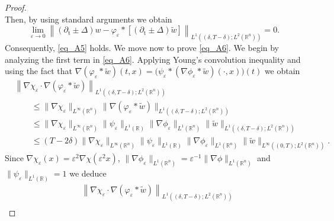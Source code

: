 \documentclass[10pt,a4paper]{amsart}
\theoremstyle{remark}
\theoremstyle{definition}
\begin{document}
\begin{proof}
$$$$
Then, by using standard arguments we obtain
$$
\lim _{\varepsilon \rightarrow 0}\left\|\left( \partial_{\mathrm{t}}\pm\Delta\right) w-\varphi_{\varepsilon} \ast\left[\left( \partial_{\mathrm{t}}\pm\Delta\right) \tilde{w}\right]\right\|_{L^1\left((\delta, T-\delta) ; L^2\left(\mathbb{R}^n\right)\right)}=0 .
$$
Consequently, \eqref{eq_A5} holds. We move now to prove \eqref{eq_A6}. We begin by analyzing the first term in \eqref{eq_A6}. Applying Young’s convolution inequality and using the fact that $ \nabla\left(\varphi_{\varepsilon} \ast \tilde{w}\right)(t,x)= \big(\psi_{\varepsilon} \ast \left( \nabla \phi_{\varepsilon} \ast \tilde{w}\right)(\cdot, x)\big) (t)$ we obtain 
\begin{align*}
& \left\|\nabla \chi_{\varepsilon} \cdot \nabla\left(\varphi_{\varepsilon} \ast \tilde{w}\right)\right\|_{L^1\left((\delta, T-\delta) ; L^2\left(\mathbb{R}^n\right)\right)} \\
 &\qquad \leq \|  \nabla \chi_{\varepsilon} \|_{L^\infty\left(\mathbb{R}^n\right)} \|  \nabla\left(\varphi_{\varepsilon} \ast \tilde{w}\right)\|_{L^1\left((\delta, T-\delta) ; L^2\left(\mathbb{R}^n\right)\right)}\\
 &\qquad\leq \|  \nabla \chi_{\varepsilon} \|_{L^\infty\left(\mathbb{R}^n\right)} \|  \psi_{\varepsilon} \|_{L^1\left(\mathbb{R}\right)} \|  \nabla \phi_{\varepsilon} \|_{L^1\left(\mathbb{R}^n\right)} \|  \tilde{w} \|_{L^1\left((\delta, T-\delta) ; L^2\left(\mathbb{R}^n\right)\right)}\\
  &\qquad \leq (T-2 \delta) \|  \nabla \chi_{\varepsilon} \|_{L^\infty\left(\mathbb{R}^n\right)} \|  \psi_{\varepsilon} \|_{L^1\left(\mathbb{R}\right)} \|  \nabla \phi_{\varepsilon} \|_{L^1\left(\mathbb{R}^n\right)} \|  \tilde{w} \|_{L^\infty\left((0, T) ; L^2\left(\mathbb{R}^n\right)\right)}.
\end{align*}
Since $\nabla \chi_{\varepsilon}(x)={\varepsilon}^2 \nabla \chi(\varepsilon^2x)$, $\|  \nabla \phi_{\varepsilon} \|_{L^1\left(\mathbb{R}^n\right)}={\varepsilon}^{-1} \|  \nabla \phi\|_{L^1\left(\mathbb{R}^n\right)}$ and $\|  \psi_{\varepsilon} \|_{L^1\left(\mathbb{R}\right)}=1$ we deduce
\begin{align*}
& \left\|\nabla \chi_{\varepsilon} \cdot \nabla\left(\varphi_{\varepsilon} \ast \tilde{w}\right)\right\|_{L^1\left((\delta, T-\delta) ; L^2\left(\mathbb{R}^n\right)\right)} \\

\end{align*}
\end{proof}
\end{document}
